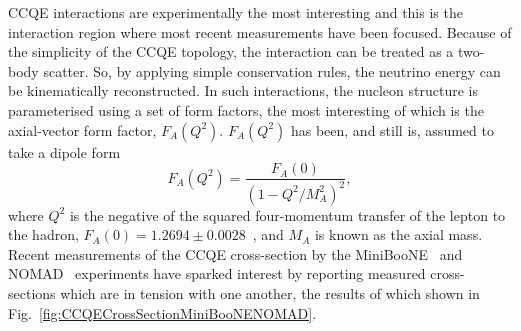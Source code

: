 \newline
\newline
CCQE interactions are experimentally the most interesting and this is the interaction region where most recent measurements have been focused.  Because of the simplicity of the CCQE topology, the interaction can be treated as a two-body scatter.  So, by applying simple conservation rules, the neutrino energy can be kinematically reconstructed.  In such interactions, the nucleon structure is parameterised using a set of form factors, the most interesting of which is the axial-vector form factor, $F_A(Q^2)$. $F_A(Q^2)$ has been, and still is, assumed to take a dipole form
\begin{equation}
F_A(Q^2) = \frac{F_A(0)}{(1-Q^2/M_A^2)^2}
\label{eq:FAFormFactor},
\end{equation}
where $Q^2$ is the negative of the squared four-momentum transfer of the lepton to the hadron, $F_A(0) = 1.2694\pm0.0028$~\cite{0954-3899-37-7A-075021}, and $M_A$ is known as the axial mass.  Recent measurements of the CCQE cross-section by the MiniBooNE~\cite{PhysRevD.81.092005} and NOMAD~\cite{NOMAD-CCQE} experiments have sparked interest by reporting measured cross-sections which are in tension with one another, the results of which shown in Fig.~\ref{fig:CCQECrossSectionMiniBooNENOMAD}.  
